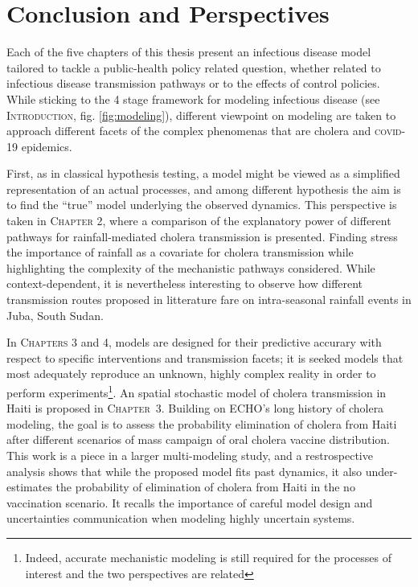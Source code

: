 \chapter*{Conclusion and Perspectives}

Each of the five chapters of this thesis present an infectious disease model tailored to tackle a public-health policy related question, whether related to infectious disease transmission pathways or to the effects of control policies. While sticking to the 4 stage framework for modeling infectious disease (see \textsc{Introduction}, fig. \ref{fig:modeling}), different viewpoint on modeling are taken to approach different facets of the complex phenomenas that are cholera and \textsc{covid}-19 epidemics.

First, as in classical hypothesis testing, a model might be viewed as a simplified representation of an actual processes, and among different hypothesis the aim is to find the ``true'' model underlying the observed dynamics. This perspective is taken in \textsc{Chapter 2}, where a comparison of the explanatory power of different pathways for rainfall-mediated cholera transmission is presented. Finding stress the importance of rainfall as a covariate for cholera transmission while highlighting the complexity of the mechanistic pathways considered.  While context-dependent, it is nevertheless interesting to observe how different transmission routes proposed in litterature fare on intra-seasonal rainfall events in Juba, South Sudan.

In \textsc{Chapters 3} and 4, models are designed for their predictive accurary with respect to specific interventions and transmission facets; it is seeked models that most adequately reproduce an unknown, highly complex reality in order to perform experiments\footnote{Indeed, accurate mechanistic modeling is still required for the processes of interest and the two perspectives are related}.  An spatial stochastic model of cholera transmission in Haiti is proposed in \textsc{Chapter~3}. Building on ECHO's long history of cholera modeling, the goal is to assess the probability elimination of cholera from Haiti after different scenarios of mass campaign of oral cholera vaccine distribution. This work is a piece in a larger multi-modeling study, and a restrospective analysis shows that while the proposed model fits past dynamics, it also under-estimates the probability of elimination of cholera from Haiti in the no vaccination scenario. It recalls the importance of careful model design and uncertainties communication when modeling highly uncertain systems. 

